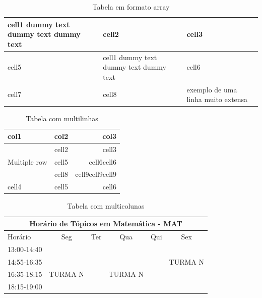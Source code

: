 \documentclass[11pt,a4paper]{report}%
\begin{document}
\begin{table}[h!] %
\begin{center}
\begin{tabular}{ | m{5em} | p{1cm}| b{1in} | } %
\hline
cell1 dummy text dummy text dummy text& cell2 & cell3 \\
\hline
cell5 & cell1 dummy text dummy text dummy text & cell6 \\
\hline
cell7 & cell8 & exemplo de uma linha muito extensa \\
\hline
\end{tabular}
\caption{Tabela em formato array } \label{tab:tabelaArray}
\end{center}
\end{table}


\begin{table}[h!]
\begin{center}
\begin{tabular}{ |l|c|r| }
\hline
col1 & col2 & col3 \\
  \hline
  \multirow{3}{4cm}{Multiple row} & cell2 & cell3 \\ %

  & cell5 & cell6cell6 \\
  & cell8 & cell9cell9cell9 \\
  \hline
  cell4 & cell5 & cell6 \\
  \hline
\end{tabular}
\end{center}
\caption{Tabela com multilinhas}
\end{table}

\begin{table}[h!] %
\begin{center}
\begin{tabular}{|l||c|c|c|c|c|}
\hline
\multicolumn{6}{|c|}{\textbf{Horário de Tópicos em Matemática - MAT}}\\
\hline
Horário    &Seg &Ter &Qua &Qui &Sex\\
\hline\hline
13:00-14:40&    &    &    &    & \\
\hline
14:55-16:35&    &    &    &    &TURMA N \\
\hline
16:35-18:15&TURMA N & &TURMA N & & \\
\hline
18:15-19:00& & & & & \\
\hline
\end{tabular}
\caption{Tabela com multicolunas}
\end{center}
\end{table}
\end{document}
